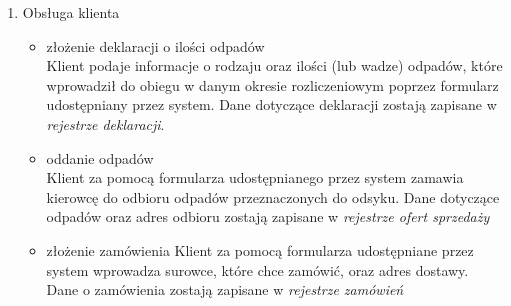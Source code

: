 
\begin{enumerate}
	\item Obsługa klienta
		\begin{itemize}
			\item złożenie deklaracji o ilości odpadów \\
			Klient podaje informacje o rodzaju oraz ilości (lub wadze) odpadów, które wprowadził do obiegu w danym okresie rozliczeniowym poprzez formularz udostępniany przez system. Dane dotyczące deklaracji zostają zapisane w \emph{rejestrze deklaracji}.
			\item oddanie odpadów \\
			Klient za pomocą formularza udostępnianego przez system zamawia kierowcę do odbioru odpadów przeznaczonych do odsyku.
			Dane dotyczące odpadów oraz adres odbioru zostają zapisane w \emph{rejestrze ofert sprzedaży}
			\item złożenie zamówienia
			Klient za pomocą formularza udostępniane przez system wprowadza surowce, które chce zamówić, oraz adres dostawy. Dane o zamówienia zostają zapisane w \emph{rejestrze zamówień}
		\end{itemize}


\end{enumerate}
